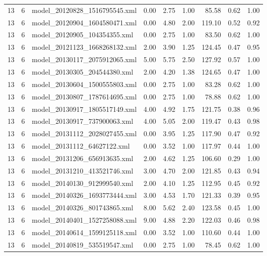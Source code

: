 \begin{table}[ht]
\begin{tabular}{rrlrrrrrr}
   13 &   6 & model\_20120828\_1516795545.xml & 0.00 & 2.75 & 1.00 & 85.58 & 0.62 & 1.00 \\ 
   13 &   6 & model\_20120904\_1604580471.xml & 0.00 & 4.80 & 2.00 & 119.10 & 0.52 & 0.92 \\ 
   13 &   6 & model\_20120905\_104354355.xml & 0.00 & 2.75 & 1.00 & 83.50 & 0.62 & 1.00 \\ 
   13 &   6 & model\_20121123\_1668268132.xml & 2.00 & 3.90 & 1.25 & 124.45 & 0.47 & 0.95 \\ 
   13 &   6 & model\_20130117\_2075912065.xml & 5.00 & 5.75 & 2.50 & 127.92 & 0.57 & 1.00 \\ 
   13 &   6 & model\_20130305\_204544380.xml & 2.00 & 4.20 & 1.38 & 124.65 & 0.47 & 1.00 \\ 
   13 &   6 & model\_20130604\_1500555803.xml & 0.00 & 2.75 & 1.00 & 83.28 & 0.62 & 1.00 \\ 
   13 &   6 & model\_20130807\_1787614695.xml & 0.00 & 2.75 & 1.00 & 78.88 & 0.62 & 1.00 \\ 
   13 &   6 & model\_20130917\_1805517149.xml & 4.00 & 4.92 & 1.75 & 121.75 & 0.38 & 0.96 \\ 
   13 &   6 & model\_20130917\_737900063.xml & 4.00 & 5.05 & 2.00 & 119.47 & 0.43 & 0.98 \\ 
   13 &   6 & model\_20131112\_2028027455.xml & 0.00 & 3.95 & 1.25 & 117.90 & 0.47 & 0.92 \\ 
   13 &   6 & model\_20131112\_64627122.xml & 0.00 & 3.52 & 1.00 & 117.97 & 0.44 & 1.00 \\ 
   13 &   6 & model\_20131206\_656913635.xml & 2.00 & 4.62 & 1.25 & 106.60 & 0.29 & 1.00 \\ 
   13 &   6 & model\_20131210\_413521746.xml & 3.00 & 4.70 & 2.00 & 121.85 & 0.43 & 0.94 \\ 
   13 &   6 & model\_20140130\_912999540.xml & 2.00 & 4.10 & 1.25 & 112.95 & 0.45 & 0.92 \\ 
   13 &   6 & model\_20140326\_1693773444.xml & 3.00 & 4.53 & 1.70 & 121.33 & 0.39 & 0.95 \\ 
   13 &   6 & model\_20140326\_801743865.xml & 8.00 & 5.62 & 2.40 & 123.58 & 0.45 & 1.00 \\ 
   13 &   6 & model\_20140401\_1527258088.xml & 9.00 & 4.88 & 2.20 & 122.03 & 0.46 & 0.98 \\ 
   13 &   6 & model\_20140614\_1599125118.xml & 0.00 & 3.52 & 1.00 & 110.60 & 0.44 & 1.00 \\ 
   13 &   6 & model\_20140819\_535519547.xml & 0.00 & 2.75 & 1.00 & 78.45 & 0.62 & 1.00 \\ 

\end{tabular}
\end{table}
